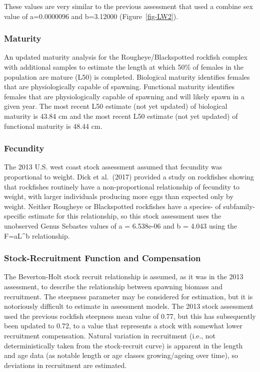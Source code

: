 \documentclass[
]{scrartcl}
\begin{document}
These values are very similar to the previous assessment that used a
combine sex value of a=0.0000096 and b=3.12000 (Figure~\ref{fig-LW2}).

\subsubsection{Maturity}\label{maturity}

An updated maturity analysis for the Rougheye/Blackspotted rockfish
complex with additional samples to estimate the length at which 50\% of
females in the population are mature (L50) is completed. Biological
maturity identifies females that are physiologically capable of
spawning. Functional maturity identifies females that are
physiologically capable of spawning and will likely spawn in a given
year. The most recent L50 estimate (not yet updated) of biological
maturity is 43.84 cm and the most recent L50 estimate (not yet updated)
of functional maturity is 48.44 cm.

\subsubsection{Fecundity}\label{fecundity}

The 2013 U.S. west coast stock assessment assumed that fecundity was
proportional to weight. Dick et al.~(2017) provided a study on
rockfishes showing that rockfishes routinely have a non-proportional
relationship of fecundity to weight, with larger individuals producing
more eggs than expected only by weight. Neither Rougheye or Blackspotted
rockfishes have a species- of subfamily-specific estimate for this
relationship, so this stock assessment uses the unobserved Genus
Sebastes values of a = 6.538e-06 and b = 4.043 using the F=aL\^{}b
relationship.

\subsubsection{Stock-Recruitment Function and
Compensation}\label{stock-recruitment-function-and-compensation}

The Beverton-Holt stock recruit relationship is assumed, as it was in
the 2013 assessment, to describe the relationship between spawning
biomass and recruitment. The steepness parameter may be considered for
estimation, but it is notoriously difficult to estimate in assessment
models. The 2013 stock assessment used the previous rockfish steepness
mean value of 0.77, but this has subsequently been updated to 0.72, to a
value that represents a stock with somewhat lower recruitment
compensation. Natural variation in recruitment (i.e., not
deterministically taken from the stock-recruit curve) is apparent in the
length and age data (as notable length or age classes growing/ageing
over time), so deviations in recruitment are estimated.
\end{document}
